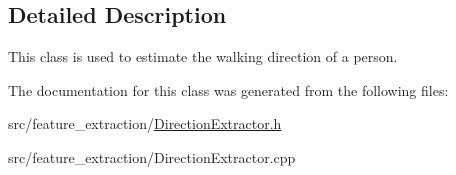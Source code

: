 \subsection{Detailed Description}
This class is used to estimate the walking direction of a person. 

The documentation for this class was generated from the following files\+:\begin{DoxyCompactItemize}
\item 
src/feature\+\_\+extraction/\mbox{\hyperlink{_direction_extractor_8h}{Direction\+Extractor.\+h}}\item 
src/feature\+\_\+extraction/Direction\+Extractor.\+cpp\end{DoxyCompactItemize}
